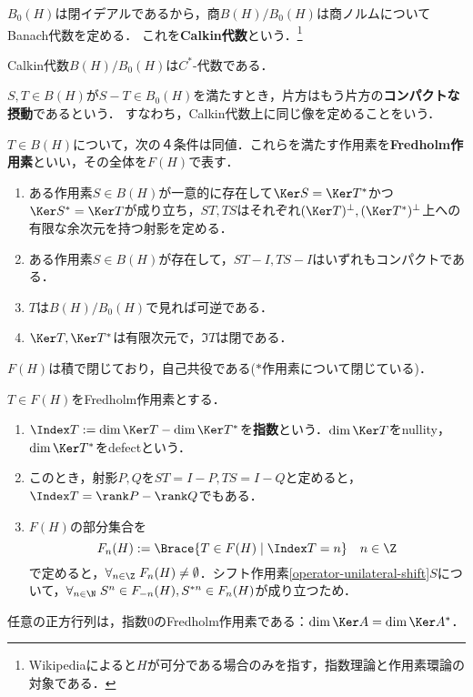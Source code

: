 \documentclass[uplatex,dvipdfmx]{jsreport}
\begin{document}
\begin{definition}
    $B_0(H)$は閉イデアルであるから，商$B(H)/B_0(H)$は商ノルムについてBanach代数を定める．
    これを\textbf{Calkin代数}という．\footnote{Wikipediaによると$H$が可分である場合のみを指す，指数理論と作用素環論の対象である．}
\end{definition}

\begin{lemma}
    Calkin代数$B(H)/B_0(H)$は$C^*$-代数である．
\end{lemma}

\begin{definition}
    $S,T\in B(H)$が$S-T\in B_0(H)$を満たすとき，片方はもう片方の\textbf{コンパクトな摂動}であるという．
    すなわち，Calkin代数上に同じ像を定めることをいう．
\end{definition}

\begin{proposition}
    $T\in B(H)$について，次の４条件は同値．これらを満たす作用素を\textbf{Fredholm作用素}といい，その全体を$F(H)$で表す．
    \begin{enumerate}
        \item ある作用素$S\in B(H)$が一意的に存在して$\Ker S=\Ker T^*$かつ$\Ker S^*=\Ker T$が成り立ち，$ST,TS$はそれぞれ$(\Ker T)^\perp,(\Ker T^*)^\perp$上への有限な余次元を持つ射影を定める．
        \item ある作用素$S\in B(H)$が存在して，$ST-I,TS-I$はいずれもコンパクトである．
        \item $T$は$B(H)/B_0(H)$で見れば可逆である．
        \item $\Ker T,\Ker T^*$は有限次元で，$\Im T$は閉である．
    \end{enumerate}
\end{proposition}
\begin{remarks}
    $F(H)$は積で閉じており，自己共役である($*$作用素について閉じている)．
\end{remarks}

\begin{definition}
    $T\in F(H)$をFredholm作用素とする．
    \begin{enumerate}
        \item $\Index T:=\dim\Ker T-\dim\Ker T^*$を\textbf{指数}という．$\dim\Ker T$をnullity，$\dim\Ker T^*$をdefectという．
        \item このとき，射影$P,Q$を$ST=I-P,TS=I-Q$と定めると，$\Index T=\rank P-\rank Q$でもある．
        \item $F(H)$の部分集合を
        \[F_n(H):=\Brace{T\in F(H)\mid\Index T=n}\quad n\in\Z\]
        で定めると，$\forall_{n\in\Z}\;F_n(H)\ne\emptyset$．シフト作用素\ref{operator-unilateral-shift}$S$について，$\forall_{n\in\N}\;S^n\in F_{-n}(H),S^{*n}\in F_n(H)$が成り立つため．
    \end{enumerate}
\end{definition}
\begin{example}
    任意の正方行列は，指数$0$のFredholm作用素である：$\dim\Ker A=\dim\Ker A^*$．
\end{example}
\end{document}
